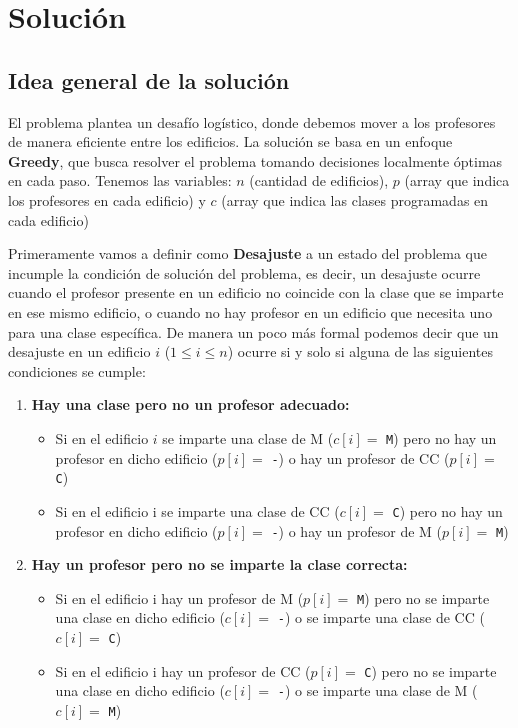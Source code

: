 \documentclass[11pt]{article}
\begin{document}
    \section{Solución}
    \subsection{Idea general de la solución}
    El problema plantea un desafío logístico, donde debemos mover a los profesores de manera eficiente entre 
    los edificios. La solución se basa en un enfoque \textbf{Greedy}, que busca resolver el problema tomando decisiones 
    localmente óptimas en cada paso. Tenemos las variables: $n$ (cantidad de edificios), $p$ (array que indica los
    profesores en cada edificio) y $c$ (array que indica las clases programadas en cada edificio)

    Primeramente vamos a definir como \textbf{Desajuste} a un estado del problema que incumple la condición
    de solución del problema, es decir, un desajuste ocurre cuando el profesor presente en un edificio no 
    coincide con la clase que se imparte en ese mismo edificio, o cuando no hay profesor en un edificio que 
    necesita uno para una clase específica. De manera un poco más formal podemos decir que un desajuste en un
    edificio $i$ ($1 \leq i \leq n$) ocurre si y solo si alguna de las siguientes condiciones se cumple:

    \begin{enumerate}
        \item \textbf{Hay una clase pero no un profesor adecuado:}
        \begin{itemize}
            \item Si en el edificio $i$ se imparte una clase de M ($c[i] =$ \texttt{M}) pero no hay
                  un profesor en dicho edificio ($p[i] =$ \texttt{-}) o hay un profesor de CC ($p[i] =$ \texttt{C})
            \item Si en el edificio i se imparte una clase de CC ($c[i] =$ \texttt{C})
                  pero no hay un profesor en dicho edificio ($p[i] =$ \texttt{-}) o hay un profesor de M 
                  ($p[i] =$ \texttt{M})
        \end{itemize}

        \item \textbf{Hay un profesor pero no se imparte la clase correcta:}
        \begin{itemize}
            \item Si en el edificio i hay un profesor de M ($p[i] =$ \texttt{M}) pero no se
                  imparte una clase en dicho edificio ($c[i] =$ \texttt{-}) o se imparte una clase de 
                  CC ($c[i] =$ \texttt{C})
            \item Si en el edificio i hay un profesor de CC ($p[i] =$ \texttt{C})
                  pero no se imparte una clase en dicho edificio ($c[i] =$ \texttt{-}) o se imparte una 
                  clase de M ($c[i] =$ \texttt{M})
        \end{itemize}
    \end{enumerate}
\end{document}
